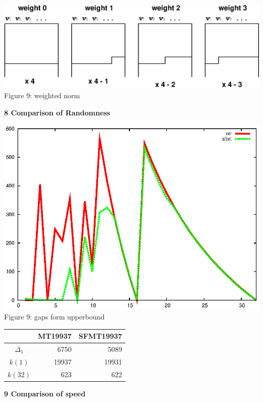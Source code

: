 \documentclass[a4j,12pt,landscape]{jarticle}
\begin{document}
\begin{center}
\includegraphics[width=\linewidth,height=0.6\textheight,
keepaspectratio]{weight.eps}
\\
Figure 9: weighted norm
\end{center}

\newpage
{\bf 8 Comparison of Randomness}
\begin{center}
\includegraphics[width=0.7\linewidth,height=0.6\textheight,
keepaspectratio]{delta.eps}
\\
Figure 9: gaps form upperbound
\end{center}
\begin{center}
\LARGE
\begin{tabular}{crr} \hline
  & MT19937 & SFMT19937 \\ \hline\hline
  $\Delta_1$ & 6750 & 5089 \\
  $k(1)$ & 19937 & 19931 \\
  $k(32)$ & 623 & 622 \\ \hline
\end{tabular}
\end{center}
\newpage
\noindent
{\bf 9 Comparison of speed}
\end{document}
